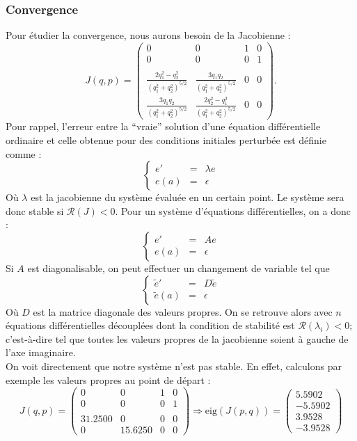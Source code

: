 \subsubsection{Convergence}
Pour étudier la convergence, nous aurons besoin de la Jacobienne :
$$J(q,p) =
\begin{pmatrix}
  0 & 0 & 1 & 0\\
  0 & 0 & 0 & 1\\\\
  \frac{2q_1^2 - q_2^2}{(q_1^2+q_2^2)^{5/2}} & \frac{3q_1q_2}{(q_1^2+q_2^2)^{5/2}} & 0 & 0 \\
  \frac{3q_1q_2}{(q_1^2+q_2^2)^{5/2}} & \frac{2q_2^2 - q_1^2}{(q_1^2+q_2^2)^{5/2}} & 0 & 0
\end{pmatrix}.
$$
Pour rappel, l'erreur entre la ``vraie'' solution d'une équation différentielle ordinaire et celle obtenue pour des conditions initiales perturbée est définie comme :
$$\left\lbrace
\begin{array}{ccc}
e' &=& \lambda e\\
e(a) &=& \epsilon
\end{array}
\right.
$$
Où $\lambda$ est la jacobienne du système évaluée en un certain point. Le système sera donc stable si $\mathcal{R} (J) <0$. Pour un système d'équations différentielles, on a donc :
$$\left\lbrace
\begin{array}{ccc}
e' &=& A e\\
e(a) &=& \epsilon
\end{array}
\right.
$$
Si $A$ est diagonalisable, on peut effectuer un changement de variable tel que
$$\left\lbrace
\begin{array}{ccc}
\tilde{e} ' &=& D \tilde{e}\\
\tilde{e} (a) &=& \epsilon
\end{array}
\right.
$$
Où $D$ est la matrice diagonale des valeurs propres. On se retrouve alors avec $n$ équations différentielles découplées dont la condition de stabilité est $\mathcal{R} (\lambda_i) <0$; c'est-à-dire tel que toutes les valeurs propres de la jacobienne soient à gauche de l'axe imaginaire.\\
On voit directement que notre système n'est pas stable. En effet, calculons par exemple les valeurs propres au point de départ :
$$J(q,p) =
\begin{pmatrix}
0 & 0 & 1 & 0\\
0 & 0 & 0 & 1\\\\
 31.2500 & 0  & 0 & 0 \\
0 & 15.6250 & 0 & 0
\end{pmatrix}
\Longrightarrow \mathrm{eig}(J(p,q))=
\begin{pmatrix}
5.5902\\
-5.5902\\
3.9528\\
-3.9528
\end{pmatrix}
$$

